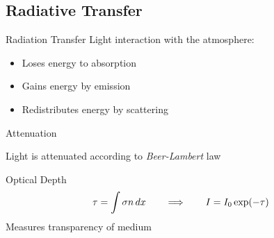 \documentclass[compress,red,12pt]{beamer}
\begin{document}
\subsection{Radiative Transfer}

\begin{frame}[label=RT]{Radiation Transfer}
  Light interaction with the atmosphere:
  \begin{itemize}
  \item Loses energy to absorption
  \item Gains energy by emission
  \item Redistributes energy by scattering
  \end{itemize}
  \hfill\hyperlink{RTE}{}  
\end{frame}


% 
\begin{frame}{Attenuation}
  \begin{block}{Light is attenuated according to {\em Beer-Lambert} law}
    \centerline{\def\svgwidth{0.6\columnwidth}\small{}}
  \end{block}
  {
    \begin{block}{Optical Depth}
      \begin{align*}
        \tau = \int \sigma n \,d{x} \qquad\Longrightarrow\qquad I=I_0 \exp(-\tau)
      \end{align*}
      Measures transparency of medium
    \end{block}
  }
\end{frame}

\end{document}
